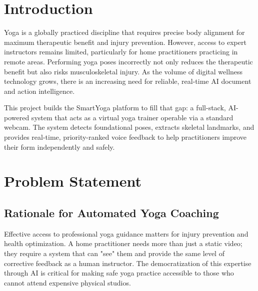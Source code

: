 
\section{Introduction}
Yoga is a globally practiced discipline that requires precise body alignment for maximum therapeutic benefit and injury prevention. However, access to expert instructors remains limited, particularly for home practitioners practicing in remote areas. Performing yoga poses incorrectly not only reduces the therapeutic benefit but also risks musculoskeletal injury. As the volume of digital wellness technology grows, there is an increasing need for reliable, real-time AI document and action intelligence. 

This project builds the SmartYoga platform to fill that gap: a full-stack, AI-powered system that acts as a virtual yoga trainer operable via a standard webcam. The system detects foundational poses, extracts skeletal landmarks, and provides real-time, priority-ranked voice feedback to help practitioners improve their form independently and safely.

\section{Problem Statement}
\subsection{Rationale for Automated Yoga Coaching}
Effective access to professional yoga guidance matters for injury prevention and health optimization. A home practitioner needs more than just a static video; they require a system that can "see" them and provide the same level of corrective feedback as a human instructor. The democratization of this expertise through AI is critical for making safe yoga practice accessible to those who cannot attend expensive physical studios.

